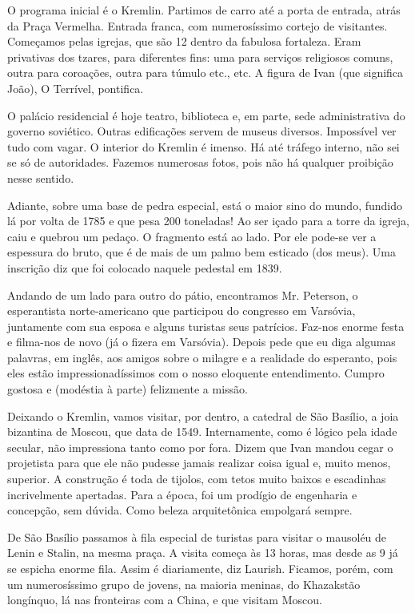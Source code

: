 O programa inicial é o Kremlin. Partimos de carro até a porta de entrada, atrás da Praça Vermelha. Entrada franca, com numerosíssimo cortejo de visitantes. Começamos pelas igrejas, que são 12 dentro da fabulosa fortaleza. Eram privativas dos tzares, para diferentes fins: uma para serviços religiosos comuns, outra para coroações, outra para túmulo etc., etc. A figura de Ivan (que significa João), O Terrível, pontifica.

O palácio residencial é hoje teatro, biblioteca e, em parte, sede administrativa do governo soviético. Outras edificações servem de museus diversos. Impossível ver tudo com vagar. O interior do Kremlin é imenso. Há até tráfego interno, não sei se só de autoridades. Fazemos numerosas fotos, pois não há qualquer proibição nesse sentido.

Adiante, sobre uma base de pedra especial, está o maior sino do mundo, fundido lá por volta de 1785 e que pesa 200 toneladas! Ao ser içado para a torre da igreja, caiu e quebrou um pedaço. O fragmento está ao lado. Por ele pode-se ver a espessura do bruto, que é de mais de um palmo bem esticado (dos meus). Uma inscrição diz que foi colocado naquele pedestal em 1839.

Andando de um lado para outro do pátio, encontramos Mr. Peterson, o esperantista norte-americano que participou do congresso em Varsóvia, juntamente com sua esposa e alguns turistas seus patrícios. Faz-nos enorme festa e filma-nos de novo (já o fizera em Varsóvia). Depois pede que eu diga algumas palavras, em inglês, aos amigos sobre o milagre e a realidade do esperanto, pois eles estão impressionadíssimos com o nosso eloquente entendimento. Cumpro gostosa e (modéstia à parte) felizmente a missão.

Deixando o Kremlin, vamos visitar, por dentro, a catedral de São Basílio, a joia bizantina de Moscou, que data de 1549. Internamente, como é lógico pela idade secular, não impressiona tanto como por fora. Dizem que Ivan mandou cegar o projetista para que ele não pudesse jamais realizar coisa igual e, muito menos, superior. A construção é toda de tijolos, com tetos muito baixos e escadinhas incrivelmente apertadas. Para a época, foi um prodígio de engenharia e concepção, sem dúvida. Como beleza arquitetônica empolgará sempre.

De São Basílio passamos à fila especial de turistas para visitar o mausoléu de Lenin e Stalin, na mesma praça. A visita começa às 13 horas, mas desde as 9 já se espicha enorme fila. Assim é diariamente, diz Laurish. Ficamos, porém, com um numerosíssimo grupo de jovens, na maioria meninas, do Khazakstão longínquo, lá nas fronteiras com a China, e que visitam Moscou.

